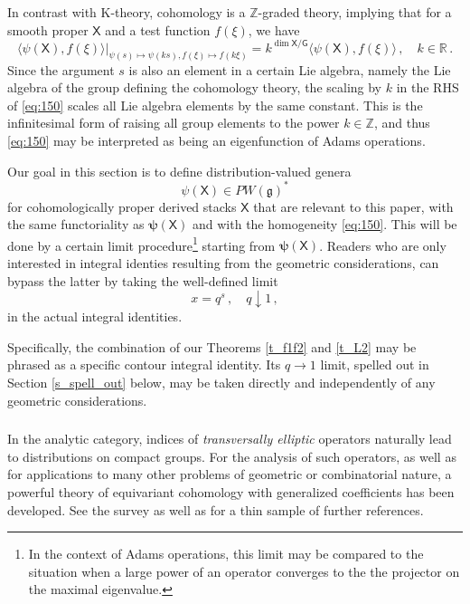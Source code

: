\documentclass[14pt]{extarticle}
\newcommand{\Z}{\mathbb{Z}}
\newcommand{\R}{\mathbb{R}}
\newcommand{\bG}{\mathsf{G}}
\newcommand{\bX}{\mathsf{X}}
\newcommand{\bpsi}{\boldsymbol{\psi}}
\newcommand{\fg}{\mathfrak{g}}
\theoremstyle{definition}
\begin{document}
In contrast with K-theory, cohomology is a $\Z$-graded theory,
implying that for a smooth proper $\bX$ and a test function
$f(\xi)$, we have
%
\begin{equation}
\langle \psi(\bX), f(\xi) \rangle
\Big|_{\psi(s) \mapsto \psi(k s), f(\xi) \mapsto f(k \xi) } =
k^{\dim \bX/\bG} \langle \psi(\bX), f(\xi) \rangle\,, \quad k \in \R
\,. 
\label{eq:150}
\end{equation}
%
Since the argument $s$ is also an element in a certain
Lie algebra, namely the Lie algebra of the group defining the cohomology
theory, the scaling by $k$ in the RHS of \eqref{eq:150} scales
all Lie algebra elements by the same constant. This is the
infinitesimal form of raising all group elements to the
power $k\in \Z$, and thus \eqref{eq:150} may be interpreted as being an
eigenfunction of Adams operations.

Our goal in this section is to define distribution-valued genera
%
\begin{equation}
  \label{eq:152}
  \psi(\bX) \in PW(\fg)^* 
\end{equation}
%
for cohomologically  proper
derived stacks $\bX$ that are relevant to this paper, with the
same functoriality as $\bpsi(\bX)$ and with the homogeneity
\eqref{eq:150}. This will be done by a certain limit
procedure\footnote{In the context of Adams operations, this limit
  may be compared to the situation when a large power of an operator converges
  to the the projector on the maximal eigenvalue.} 
starting from $\bpsi(\bX)$. Readers who are only interested in
integral identies resulting from the geometric considerations, can
bypass the latter by taking the well-defined limit
%
\begin{equation}
  \label{eq:151}
  x = q^s\,, \quad q \downarrow 1 \,, 
\end{equation}
%
in the actual integral identities.

Specifically, the combination of our Theorems
\ref{t_f1f2} and \ref{t_L2} may be phrased as a specific contour
integral identity. Its $q\to
1$ limit, spelled out in Section \ref{s_spell_out} below, 
may be taken directly and independently of any geometric 
considerations. 



\subsubsection{}

In the analytic category, indices of \emph{transversally elliptic}
operators \cite{Atiyah} naturally lead to distributions on compact
groups. For the analysis of such operators, as well as for applications to 
many other problems of geometric 
or combinatorial nature, a powerful theory of equivariant cohomology with
generalized coefficients has been developed. See the survey
\cite{Vergne} as well as \cite{BerlVerg, BravM, CPV2,  CPV,
 ParVerg} for a thin sample of further 
references.
\end{document}

